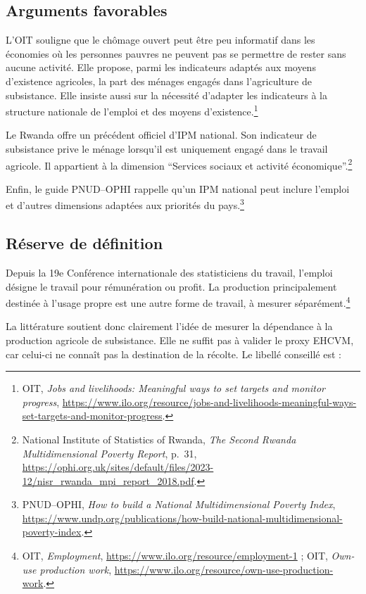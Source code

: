 \documentclass[11pt,a4paper]{article}
\begin{document}
\subsection{Arguments favorables}

L'OIT souligne que le chômage ouvert peut être peu informatif dans les économies où les personnes
pauvres ne peuvent pas se permettre de rester sans aucune activité. Elle propose, parmi les
indicateurs adaptés aux moyens d'existence agricoles, la part des ménages engagés dans
l'agriculture de subsistance. Elle insiste aussi sur la nécessité d'adapter les indicateurs à la
structure nationale de l'emploi et des moyens d'existence.\footnote{OIT, \emph{Jobs and
livelihoods: Meaningful ways to set targets and monitor progress},
\url{https://www.ilo.org/resource/jobs-and-livelihoods-meaningful-ways-set-targets-and-monitor-progress}.}

Le Rwanda offre un précédent officiel d'IPM national. Son indicateur de subsistance prive le
ménage lorsqu'il est uniquement engagé dans le travail agricole. Il appartient à la dimension
``Services sociaux et activité économique''.\footnote{National Institute of Statistics of
Rwanda, \emph{The Second Rwanda Multidimensional Poverty Report}, p.~31,
\url{https://ophi.org.uk/sites/default/files/2023-12/nisr_rwanda_mpi_report_2018.pdf}.}

Enfin, le guide PNUD--OPHI rappelle qu'un IPM national peut inclure l'emploi et d'autres dimensions
adaptées aux priorités du pays.\footnote{PNUD--OPHI, \emph{How to build a National
Multidimensional Poverty Index},
\url{https://www.undp.org/publications/how-build-national-multidimensional-poverty-index}.}

\subsection{Réserve de définition}

Depuis la 19e Conférence internationale des statisticiens du travail, l'emploi désigne le travail
pour rémunération ou profit. La production principalement destinée à l'usage propre est une autre
forme de travail, à mesurer séparément.\footnote{OIT, \emph{Employment},
\url{https://www.ilo.org/resource/employment-1} ; OIT, \emph{Own-use production work},
\url{https://www.ilo.org/resource/own-use-production-work}.}

La littérature soutient donc clairement l'idée de mesurer la dépendance à la production agricole
de subsistance. Elle ne suffit pas à valider le proxy EHCVM, car celui-ci ne connaît pas la
destination de la récolte. Le libellé conseillé est :
\end{document}
